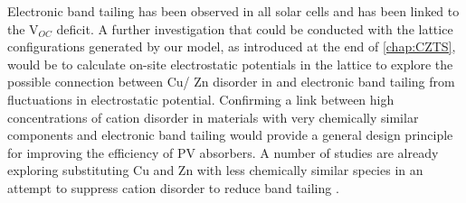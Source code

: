 \documentclass[11pt, twoside]{report}
\begin{document}


Electronic band tailing has been observed in all {\CZTS} solar cells and has been linked to the V$_{OC}$ deficit.
A further investigation that could be conducted with the lattice configurations generated by our model, as introduced at the end of \autoref{chap:CZTS}, would be to calculate on-site electrostatic potentials in the lattice to explore the possible connection between Cu/ Zn disorder in {\CZTS} and electronic band tailing from fluctuations in electrostatic potential. Confirming a link between high concentrations of cation disorder in materials with very chemically similar components and electronic band tailing would provide a general design principle for improving the efficiency of PV absorbers. A number of studies are already exploring substituting Cu and Zn with less chemically similar species in an attempt to suppress cation disorder to reduce band tailing \cite{Gerschon_AZTSe, distant_cations, Tong_Ba-CZTS}. 
\end{document}
